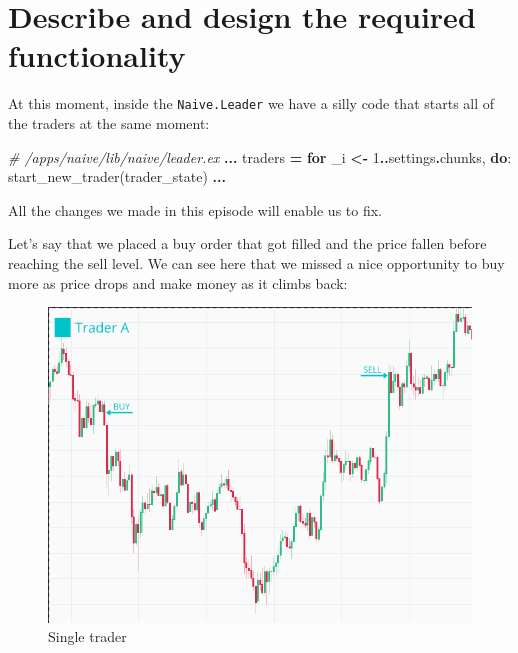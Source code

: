 \documentclass[
]{book}
\newenvironment{Shaded}{\begin{snugshade}}{\end{snugshade}}
\newcommand{\CommentTok}[1]{\textcolor[rgb]{0.56,0.35,0.01}{\textit{#1}}}
\newcommand{\DecValTok}[1]{\textcolor[rgb]{0.00,0.00,0.81}{#1}}
\newcommand{\KeywordTok}[1]{\textcolor[rgb]{0.13,0.29,0.53}{\textbf{#1}}}
\newcommand{\NormalTok}[1]{#1}
\newcommand{\OperatorTok}[1]{\textcolor[rgb]{0.81,0.36,0.00}{\textbf{#1}}}
\begin{document}
\hypertarget{describe-and-design-the-required-functionality}{%
\section{Describe and design the required functionality}\label{describe-and-design-the-required-functionality}}

At this moment, inside the \texttt{Naive.Leader} we have a silly code that
starts all of the traders at the same moment:

\begin{Shaded}
\begin{Highlighting}[]
    \CommentTok{\# /apps/naive/lib/naive/leader.ex}
    \OperatorTok{...}
\NormalTok{    traders }\OperatorTok{=}
      \KeywordTok{for}\NormalTok{ \_i }\OperatorTok{\textless{}{-}} \DecValTok{1}\OperatorTok{..}\NormalTok{settings}\OperatorTok{.}\NormalTok{chunks,}
          \KeywordTok{do}\NormalTok{: start\_new\_trader(trader\_state)}
    \OperatorTok{...}
\end{Highlighting}
\end{Shaded}

All the changes we made in this episode will enable us to fix.

Let's say that we placed a buy order that got filled and the price fallen before reaching the sell level. We can see here that we missed a nice opportunity to buy more as price drops and make money as it climbs back:

\begin{figure}
\centering
\includegraphics{images/chapter_09_01_single_trader.png}
\caption{Single trader}
\end{figure}
\end{document}
